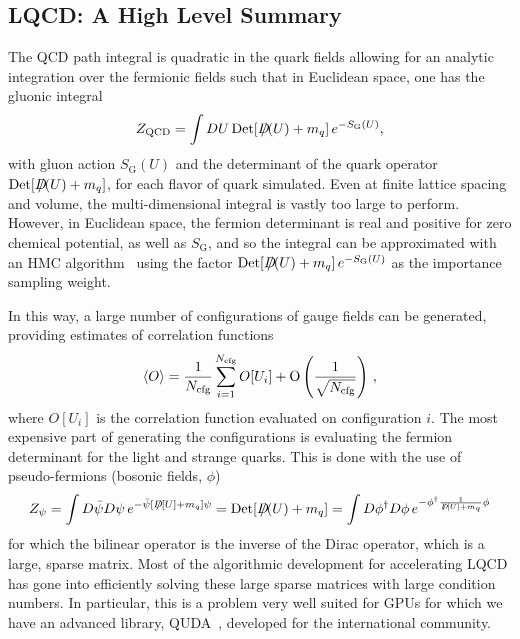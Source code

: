 \documentclass{ar-1col}
\def\Dslash{D\hskip-0.65em /}
\def\Dslashe{D\hskip-0.5em /}
\begin{document}
\subsection{LQCD: A High Level Summary}
The QCD path integral is quadratic in the quark fields allowing for an analytic integration over the fermionic fields such that in Euclidean space, one has the gluonic integral
\begin{equation}\label{eq:Z_QCD}
Z_{\mathrm{QCD}} = \int D U\, {\rm Det}[\Dslash(U) + m_q]\, e^{-S_{\mathrm{G}}(U)},
\end{equation}
with gluon action $S_{\mathrm{G}}(U)$ and the determinant of the quark operator ${\rm Det}[\Dslash(U) + m_q]$, for each flavor of quark simulated.
Even at finite lattice spacing and volume, the multi-dimensional integral is vastly too large to perform.
However, in Euclidean space, the fermion determinant is real and positive for zero chemical potential, as well as $S_{\mathrm{G}}$, and so the integral can be approximated with an HMC algorithm~\cite{Duane:1987de} using the factor ${\rm Det}[\Dslash(U) + m_q]\, e^{-S_{\mathrm{G}}(U)}$ as the importance sampling weight.%
\begin{marginnote}
\end{marginnote}%
In this way, a large number of configurations of gauge fields can be generated, providing estimates of correlation functions
\begin{equation}
\langle O \rangle = \frac{1}{N_{\rm cfg}}\sum_{i=1}^{N_{\rm cfg}} O[U_i]
    +\mathrm{O}\left(\frac{1}{\sqrt{N_{\rm cfg}}} \right)\, ,
\end{equation}
where $O[U_i]$ is the correlation function evaluated on configuration $i$.
The most expensive part of generating the configurations is evaluating the fermion determinant for the light and strange quarks.
This is done with the use of pseudo-fermions (bosonic fields, $\phi$)
\begin{equation}
Z_\psi = \int D\bar{\psi}D\psi\, e^{-\bar{\psi}[\Dslashe[U]+m_q]\psi}
    = {\rm Det}[\Dslash(U) + m_q]
    = \int D\phi^\dagger D\phi\, e^{-\phi^\dagger \frac{1}{\Dslashe[U]+m_q} \phi}
\end{equation}
for which the bilinear operator is the inverse of the Dirac operator, which is a large, sparse matrix.
Most of the algorithmic development for accelerating LQCD has gone into efficiently solving these large sparse matrices with large condition numbers.  In particular, this is a problem very well suited for GPUs
for which we have an advanced library, QUDA~\cite{Clark:2009wm,Babich:2011np}, developed for the international community.%
\begin{marginnote}
\end{marginnote}%
\end{document}

